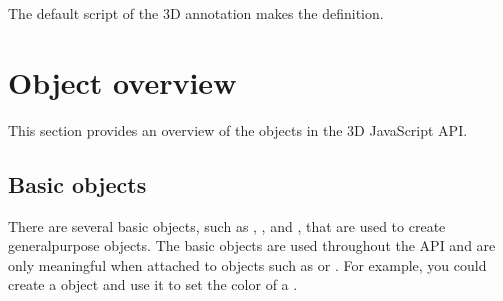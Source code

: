 \documentclass[letterpaper,12pt,english,openany,oneside]{sphinxmanual}
\begin{document}
\begin{sphinxVerbatim}[commandchars=\\\{\}]
         
   \PYG{p}{[}\PYG{p}{]}

          

         
\end{sphinxVerbatim}

The default script of the 3D annotation makes the definition.

\begin{sphinxVerbatim}[commandchars=\\\{\}]
    
            
           
\end{sphinxVerbatim}


\section{Object overview}
\label{\detokenize{index:object-overview}}
This section provides an overview of the objects in the 3D JavaScript API.


\subsection{Basic objects}
\label{\detokenize{index:basic-objects}}
There are several basic objects, such as  ,  , and  , that are used to create general\sphinxhyphen{}purpose objects. The basic objects are used throughout the API and are only meaningful when attached to objects such as  or  . For example, you could create a  object and use it to set the  color of a  .
\end{document}
